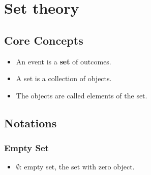 \documentclass[11pt]{article}
\begin{document}

\section{Set theory}
\subsection{Core Concepts}
\begin{itemize}
  \item An event is a \textbf{set} of outcomes.
  \item A set is a collection of objects.
  \item The objects are called elements of the set.
\end{itemize}
\subsection{Notations}

\subsubsection{Empty Set}
\begin{itemize}
  \item $\emptyset$: empty set, the set with zero object.
\end{itemize}
\end{document}
